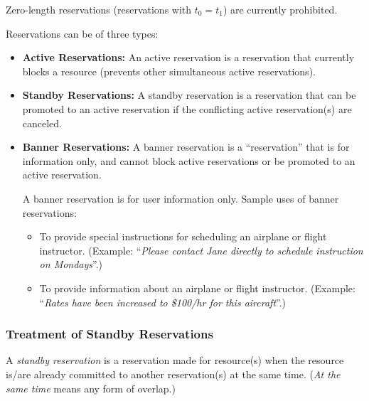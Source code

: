 \documentclass[letterpaper,10pt,titlepage]{article}
\begin{document}
Zero-length reservations (reservations with $t_0 = t_1$) are currently prohibited.

Reservations can be of three types:

\begin{itemize}
\item {}\textbf{Active Reservations:}
      An active reservation is a reservation that currently blocks a resource
      (prevents other simultaneous active reservations).
\item {}\textbf{Standby Reservations:}
      A standby reservation is a reservation that can be promoted to
      an active reservation if the conflicting active reservation(s)
      are canceled.
\item {}\textbf{Banner Reservations:}
      A banner reservation is a ``reservation'' that is for
      information only, and cannot block active reservations or be
      promoted to an active reservation.

      A banner reservation is for user information only.  Sample
      uses of banner reservations:

      \begin{itemize}
      \item To provide special instructions for scheduling an airplane
            or flight instructor.  (Example: ``\emph{Please contact Jane
            directly to schedule instruction on Mondays}''.)
      \item To provide information about an airplane or flight
            instructor.  (Example:  ``\emph{Rates have been
            increased to \$100/hr for this aircraft}''.)
      \end{itemize}
\end{itemize}


\subsubsection{Treatment of Standby Reservations}
\label{stdd0:ssby0}

A \emph{standby reservation}
is a reservation made for resource(s) when the resource is/are already 
committed to another reservation(s) at the same time.  (\emph{At the same time} means
any form of overlap.)
\end{document}

